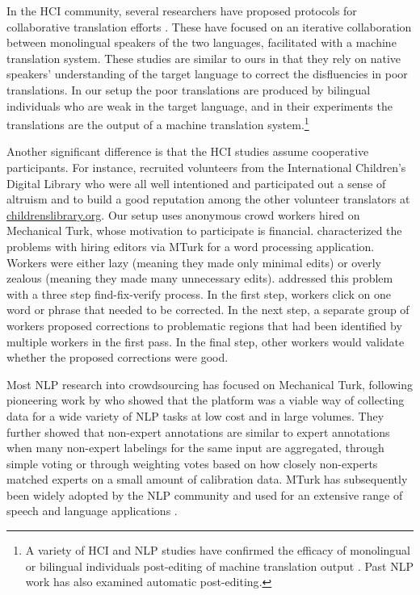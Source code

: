 \documentclass[11pt]{article}
\begin{document}
In the HCI community, several researchers have proposed protocols for collaborative translation efforts \cite{Morita:2009:PRIMA,Morita:2009:IUI,Hu:2009,Hu:2010}.  These have focused on an iterative collaboration between monolingual speakers of the two languages, facilitated with a machine translation system.
These studies are similar to ours in that they rely on native speakers' understanding of the target language to correct the disfluencies in poor translations.  In our setup the poor translations are produced by bilingual individuals who are weak in the target language, and in their experiments the translations are the output of a machine translation system.\footnote{A variety of HCI and NLP studies have confirmed the efficacy of monolingual or bilingual individuals post-editing of machine translation output \cite{callisonburch:2005:NIST,koehn:2010:NAACLHLT,Green:2013:EHP:2470654.2470718}.  Past NLP work has also examined automatic post-editing\cite{Knight94automatedpostediting}.}

Another significant difference is that the HCI studies assume cooperative participants.   For instance,  recruited volunteers from the International Children's Digital Library \cite{hourcade2003international} who were all well intentioned and participated out a sense of altruism and to build a good reputation among the other volunteer translators at \url{childrenslibrary.org}.
Our setup uses anonymous crowd workers hired on Mechanical Turk, whose motivation to participate is financial.
%
 characterized the problems with hiring editors via MTurk for a word processing application.  Workers were either lazy (meaning they made only minimal edits) or overly zealous (meaning they made many unnecessary edits).   addressed this problem with a three step find-fix-verify process.  In the first step, workers click on one word or phrase that needed to be corrected.  In the next step, a separate group of workers proposed corrections to problematic regions that had been identified by multiple workers in the first pass.  In the final step, other workers would validate whether the proposed corrections were good.

Most NLP research into crowdsourcing has focused on Mechanical Turk, following pioneering work by  who showed that the platform was a viable way of collecting data for a wide variety of NLP tasks at low cost and in large volumes.  They further showed that non-expert annotations are similar to expert annotations when many non-expert labelings for the same input are aggregated, through simple voting or through weighting votes based on how closely non-experts matched experts on a small amount of calibration data.  MTurk has subsequently been widely adopted by the NLP community and used for an extensive range of speech and language applications \cite{callisonburch-dredze:2010:MTURK}.
\end{document}
